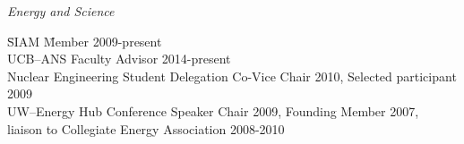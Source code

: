 \textit{Energy and Science}
\begin{tabbing}
\hspace*{2 em}\= SIAM  \hspace*{15em} \= Member 2009-present\\
%
\> UCB--ANS \> Faculty Advisor 2014-present  \\
%
%
%
\> Nuclear Engineering Student Delegation \> Co-Vice Chair 2010, Selected participant 2009\\
%
\> UW--Energy Hub \> Conference Speaker Chair 2009, Founding Member 2007,  \\ \> \> liaison to Collegiate Energy Association 2008-2010\\
%
%
%
\end{tabbing}

